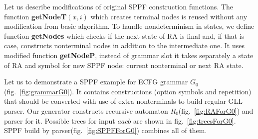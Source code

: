 \documentclass[runningheads,a4paper]{llncs}
\begin{document}
Let us describe modifications of original SPPF construction functions.
The function \textbf{getNodeT$(x,i)$} which creates terminal nodes is reused without any modification from basic algorithm.
To handle nondeterminism in states, we define function \textbf{getNodes} which checks if the next state of RA
is final and, if that is case, constructs nonterminal nodes in addition to the intermediate one.
It uses modified function \textbf{getNodeP}, instead of grammar slot it takes separately a 
state of RA and symbol for new SPPF node: current nonterminal or next RA state.




Let us to demonstrate a SPPF example for ECFG grammar $G_0$(fig.~\ref{fig:grammarG0}).
It contains constructions (option symbols and repetition) that should be converted with
use of extra nonterminals to build regular GLL parser. Our generator constructs
recursive automaton $R_0$(fig.~\ref{fig:RAForG0}) and parser for it.
Possible trees for input $ aacb $ are shown in fig.~\ref{fig:treesForG0}.
SPPF build by parser(fig.~\ref{fig:SPPFForG0}) combines all of them.
\end{document}
